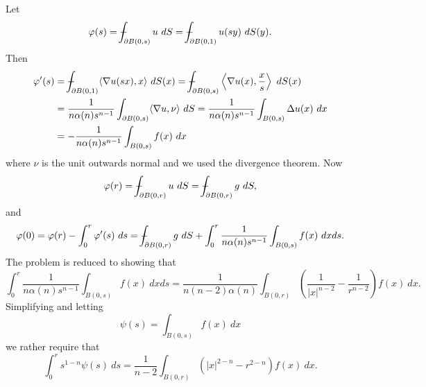 \documentclass[10pt]{article}
\def\Xint#1{\mathchoice
{\XXint\displaystyle\textstyle{#1}}%
{\XXint\textstyle\scriptstyle{#1}}%
{\XXint\scriptstyle\scriptscriptstyle{#1}}%
{\XXint\scriptscriptstyle\scriptscriptstyle{#1}}%
\!\int}
\def\XXint#1#2#3{{\setbox0=\hbox{$#1{#2#3}{\int}$ }
\vcenter{\hbox{$#2#3$ }}\kern-.6\wd0}}
\def\dashint{\Xint-}
\theoremstyle{definition}
\begin{document}
Let
$$\varphi(s) = \dashint_{\partial B(0, s)} u~dS = \dashint_{\partial B(0, 1)} u(sy)~dS(y).$$
Then
\begin{align*}
  \varphi'(s) &= \dashint_{\partial B(0, 1)} \langle \nabla u(sx), x\rangle ~dS(x)
  = \dashint_{\partial B(0, s)} \left\langle \nabla u(x), \frac{x}{s} \right\rangle ~dS(x)\\
  &= \frac{1}{n\alpha(n)s^{n-1}} \int_{\partial B(0, s)} \langle \nabla u, \nu\rangle ~dS
  = \frac{1}{n\alpha(n)s^{n-1}} \int_{B(0, s)} \Delta u(x)~dx\\
  &= -\frac{1}{n\alpha(n)s^{n-1}}\int_{B(0, s)} f(x)~dx
\end{align*}
where $\nu$ is the unit outwards normal and we used the divergence theorem. Now
$$\varphi(r) = \dashint_{\partial B(0, r)} u~dS = \dashint_{\partial B(0, r)} g~dS,$$
and
$$\varphi(0) = \varphi(r) - \int_0^r \varphi'(s)~ds = \dashint_{\partial B(0, r)} g~dS + \int_0^r \frac{1}{n\alpha(n)s^{n-1}}\int_{B(0, s)} f(x)~dxds.$$
The problem is reduced to showing that
\begin{equation}
\label{MVP reduction 1}
\int_0^r \frac{1}{n\alpha(n)s^{n-1}}\int_{B(0, s)} f(x)~dxds = \frac{1}{n(n-2)\alpha(n)} \int_{B(0, r)} \left(\frac{1}{|x|^{n-2}} - \frac{1}{r^{n-2}}\right) f(x)~dx.
\end{equation}
Simplifying and letting
$$\psi(s) = \int_{B(0, s)} f(x) ~dx$$
we rather require that
$$\int_0^r s^{1-n} \psi(s) ~ds = \frac{1}{n-2} \int_{B(0, r)} (|x|^{2-n} - r^{2-n}) f(x)~dx.$$
\end{document}
